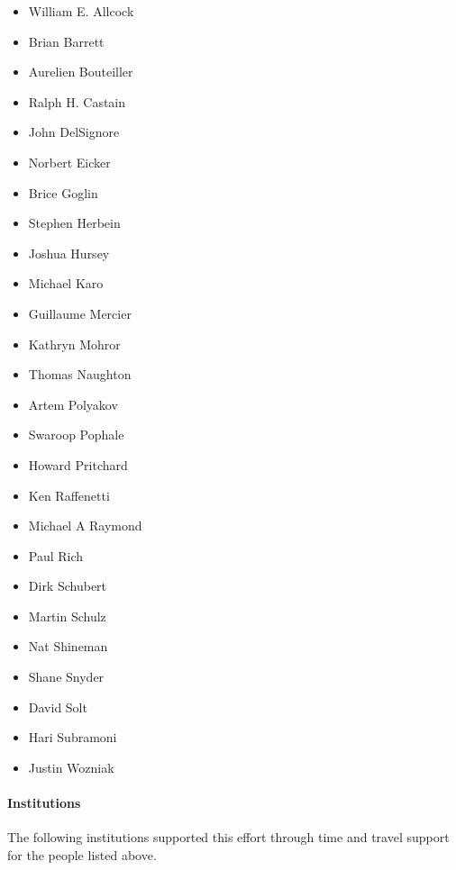 \begin{itemize}
    \item William E. Allcock
    \item Brian Barrett
    \item Aurelien Bouteiller
    \item Ralph H. Castain
    \item John DelSignore
    \item Norbert Eicker
    \item Brice Goglin
    \item Stephen Herbein
    \item Joshua Hursey
    \item Michael Karo
    \item Guillaume Mercier
    \item Kathryn Mohror
    \item Thomas Naughton
    \item Artem Polyakov
    \item Swaroop Pophale
    \item Howard Pritchard
    \item Ken Raffenetti
    \item Michael A Raymond
    \item Paul Rich
    \item Dirk Schubert
    \item Martin Schulz
    \item Nat Shineman
    \item Shane Snyder
    \item David Solt
    \item Hari Subramoni
    \item Justin Wozniak
\end{itemize}

\paragraph*{Institutions}

The following institutions supported this effort through time and travel support for the people listed above.


